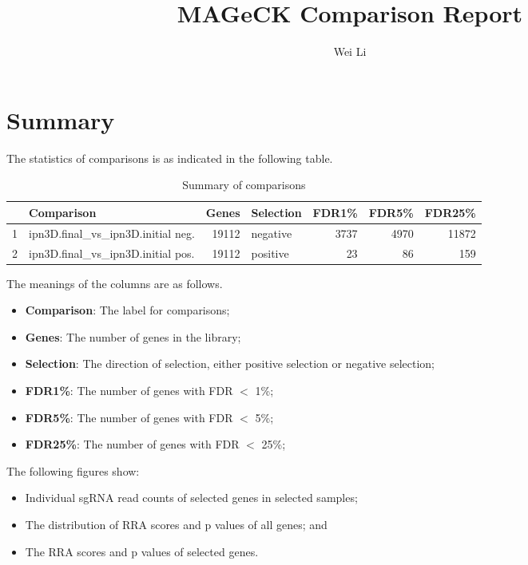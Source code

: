 \documentclass{article}
\begin{document}

\title{MAGeCK Comparison Report}
\author{Wei Li}

\maketitle


\tableofcontents

\section{Summary}


The statistics of comparisons is as indicated in the following table. 

\begin{table}[ht]
\centering
\begin{tabular}{rlrlrrr}
  \hline
 & Comparison & Genes & Selection & FDR1\% & FDR5\% & FDR25\% \\ 
  \hline
1 & ipn3D.final\_vs\_ipn3D.initial neg. & 19112 & negative & 3737 & 4970 & 11872 \\ 
  2 & ipn3D.final\_vs\_ipn3D.initial pos. & 19112 & positive & 23 & 86 & 159 \\ 
   \hline
\end{tabular}
\caption{Summary of comparisons} 
\label{tab:one}
\end{table}
The meanings of the columns are as follows.

\begin{itemize}
\item \textbf{Comparison}: The label for comparisons;
\item \textbf{Genes}: The number of genes in the library;
\item \textbf{Selection}: The direction of selection, either positive selection or negative selection;
\item \textbf{FDR1\%}: The number of genes with FDR $<$ 1\%;
\item \textbf{FDR5\%}: The number of genes with FDR $<$ 5\%;
\item \textbf{FDR25\%}: The number of genes with FDR $<$ 25\%;
\end{itemize}

The following figures show:

\begin{itemize}
\item Individual sgRNA read counts of selected genes in selected samples; 
\item The distribution of RRA scores and p values of all genes; and
\item The RRA scores and p values of selected genes.
\end{itemize}
\end{document}
